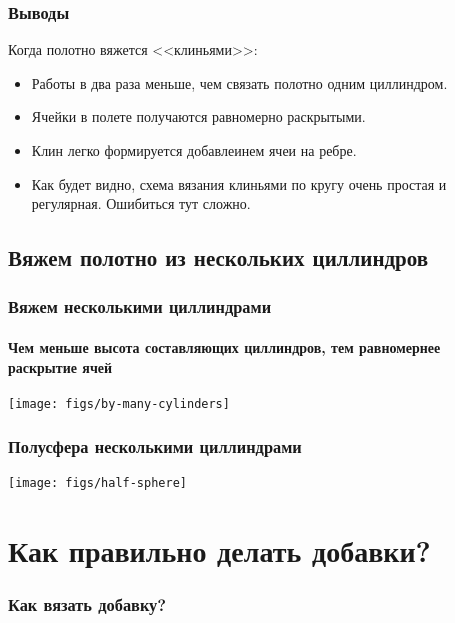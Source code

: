 \begin{frame}
    \frametitle{Выводы}

	Когда полотно вяжется <<клиньями>>:
    \begin{itemize}
        \item Работы в два раза меньше, чем связать полотно одним циллиндром.
        \item Ячейки в полете получаются равномерно раскрытыми.
		\item Клин легко формируется добавлеинем ячеи на ребре.
        \item Как будет видно, схема вязания клиньями по кругу очень простая и регулярная. Ошибиться тут сложно.
    \end{itemize}
\end{frame}


\subsection{Вяжем полотно из нескольких циллиндров}

\begin{frame}
    \frametitle{Вяжем несколькими циллиндрами}
    \framesubtitle{Чем меньше высота составляющих циллиндров, тем равномернее раскрытие ячей}

    \begin{center}
        \texttt{[image: figs/by-many-cylinders]}
    \end{center}
\end{frame}

\begin{frame}
    \frametitle{Полусфера несколькими циллиндрами}

    \begin{center}
        \texttt{[image: figs/half-sphere]}
    \end{center}
\end{frame}


\section{Как правильно делать добавки?}

\begin{frame}
    \frametitle{Как вязать добавку?}

\end{frame}


